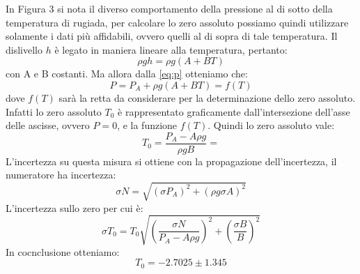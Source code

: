 In Figura 3 si nota il diverso comportamento della pressione al di sotto della temperatura di rugiada, per calcolare lo zero assoluto possiamo quindi utilizzare solamente i dati più affidabili, ovvero quelli al di sopra di tale temperatura.
Il dislivello $h$ è legato in maniera lineare alla temperatura, pertanto:
\begin{equation}
\rho gh = \rho g (A + B T)
\end{equation}
con A e B costanti.
Ma allora dalla \eqref{eq:p} otteniamo che:
\begin{equation}
P = P_A + \rho g (A + B T) = f (T)
\end{equation}
dove $f(T)$ sarà la retta da considerare per la determinazione dello zero assoluto.
Infatti lo zero assoluto $T_0$ è rappresentato graficamente dall'intersezione dell'asse delle ascisse, ovvero $P = 0$, e la funzione $f(T)$.
Quindi lo zero assoluto vale: 
\begin{equation}
T_0 = \frac{P_A - A \rho g}{\rho gB} =
\end{equation}
L'incertezza su questa misura si ottiene con la propagazione dell'incertezza, il numeratore ha incertezza:
\begin{equation}
\sigma N = \sqrt{(\sigma P_A)^2 + (\rho g \sigma A)^2}
\end{equation}
L'incertezza sullo zero per cui è:
\begin{equation}
\sigma T_0 = T_0\sqrt{\left(\frac{\sigma N}{P_A - A \rho g}\right)^2 +\left(\frac{\sigma B}{B}\right)^2 } 
\end{equation}
In cocnclusione otteniamo:
\[T_0 = -2.7025 \pm 1.345 \]


